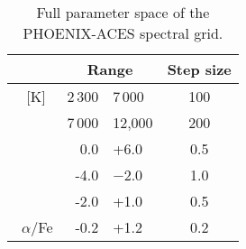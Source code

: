 
\begin{table}
    \centering
    \caption{Full parameter space of the {PHOENIX-ACES} spectral grid.}
    \begin{tabular}{lr@{ -- }lc}    %
        \toprule
        & \multicolumn{2}{c}{Range}       & Step size\\
        \midrule
        \ \teff{} [K] &  2\,300 & 7\,000  & 100 \\
        &  7\,000 & 12,000 & 200 \\ 
        \ \logg{}     &  0.0 & +6.0   & 0.5 \\
        \ \feh{}   &  -4.0 & $-$2.0  & 1.0 \\    %
        &  -2.0 & +1.0  & 0.5 \\
        \  \(\alpha\)/Fe &  -0.2 & +1.2  & 0.2 \\
        \bottomrule
    \end{tabular}
    \label{tab:phoenix}
\end{table}

